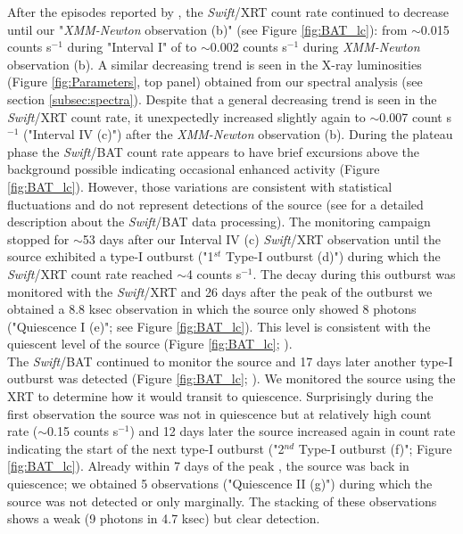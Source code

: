 \documentclass[a4paper,fleqn,usenatbib]{mnras}
\begin{document}
\indent After the episodes reported by \cite{Wijnands2016}, the \textit{Swift}/XRT count rate continued to decrease until our "\textit{XMM-Newton} observation (b)" (see Figure \ref{fig:BAT_lc}): from $\sim$0.015 counts s$^{-1}$ during "Interval I" of \citet*[i.e., at the start of the plateau phase]{Wijnands2016} to $\sim$0.002 counts s$^{-1}$ during \textit{XMM-Newton} observation (b). A similar decreasing trend is seen in the X-ray luminosities (Figure \ref{fig:Parameters}, top panel) obtained from our spectral analysis (see section \ref{subsec:spectra}). Despite that a general decreasing trend is seen in the \textit{Swift}/XRT count rate, it unexpectedly increased slightly again to $\sim$0.007 count s$^{-1}$ ("Interval IV (c)") after the\textit{ XMM-Newton} observation (b). During the plateau phase the \textit{Swift}/BAT count rate appears to have brief excursions above the background possible indicating occasional enhanced activity (Figure \ref{fig:BAT_lc}). However, those variations are consistent with statistical fluctuations and do not represent detections of the source (see \citealt{Krimm2013} for a detailed description about the \textit{Swift}/BAT data processing). The monitoring campaign stopped for $\sim$53 days after our Interval IV (c) \textit{Swift}/XRT observation until the source exhibited a type-I outburst ("1$^{st}$ Type-I outburst (d)") during which the \textit{Swift}/XRT count rate reached $\sim$4 counts s$^{-1}$. The decay during this outburst was monitored with the \textit{Swift}/XRT and 26 days after the peak of the outburst we obtained a 8.8 ksec observation in which the source only showed 8 photons ("Quiescence I (e)"; see Figure \ref{fig:BAT_lc}). This level is consistent with the quiescent level of the source (Figure \ref{fig:BAT_lc}; \citealt{Tsygankov2017b}).\\
\indent The \textit{Swift}/BAT continued to monitor the source and 17 days later another type-I outburst was detected (Figure \ref{fig:BAT_lc}; \citealt{Nakajima2016b}). We monitored the source using the XRT to determine how it would transit to quiescence. Surprisingly during the first observation the source was not in quiescence but at relatively high count rate ($\sim$0.15 counts s$^{-1}$) and 12 days later the source increased again in count rate indicating the start of the next type-I outburst ("2$^{nd}$ Type-I outburst (f)"; Figure \ref{fig:BAT_lc}). Already within 7 days of the peak , the source was back in quiescence; we obtained 5 observations ("Quiescence II (g)") during which the source was not detected or only marginally. The stacking of  these observations shows a weak (9 photons in 4.7 ksec) but clear detection.\\
\end{document}
